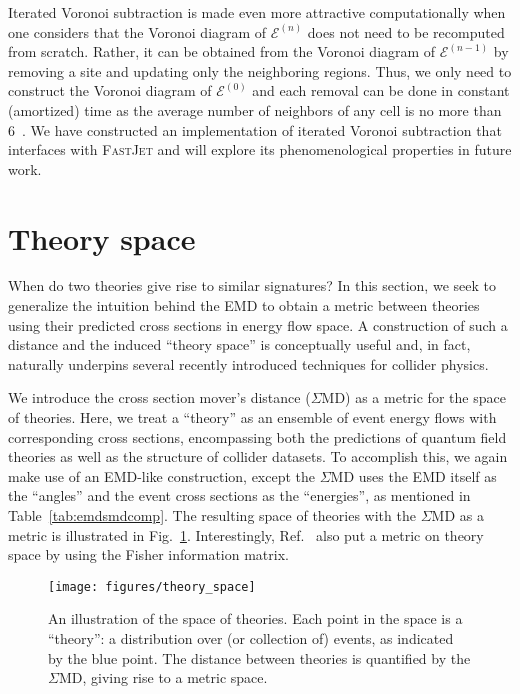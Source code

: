 \documentclass[letterpaper,11pt]{article}
\newcommand{\E}{\mathcal{E}}
\DeclareRobustCommand{\Tab}[1]{Table~\ref{#1}}
\DeclareRobustCommand{\Fig}[1]{Fig.~\ref{#1}}
\DeclareRobustCommand{\Ref}[1]{Ref.~\cite{#1}}
\begin{document}
Iterated Voronoi subtraction is made even more attractive computationally when one considers that the Voronoi diagram of $\E^{(n)}$ does not need to be recomputed from scratch.
%
Rather, it can be obtained from the Voronoi diagram of $\E^{(n-1)}$ by removing a site and updating only the neighboring regions.
%
Thus, we only need to construct the Voronoi diagram of $\E^{(0)}$ and each removal can be done in constant (amortized) time as the average number of neighbors of any cell is no more than 6~\cite{Aurenhammer2013:book}.
%
We have constructed an implementation of iterated Voronoi subtraction that interfaces with \textsc{FastJet} and will explore its phenomenological properties in future work.



\section{Theory space}
\label{sec:theory}


When do two theories give rise to similar signatures?
%
In this section, we seek to generalize the intuition behind the EMD to obtain a metric between theories using their predicted cross sections in energy flow space.
%
A construction of such a distance and the induced ``theory space'' is conceptually useful and, in fact, naturally underpins several recently introduced techniques for collider physics.


We introduce the cross section mover's distance ($\Sigma$MD) as a metric for the space of theories.
%
Here, we treat a ``theory'' as an ensemble of event energy flows with corresponding cross sections, encompassing both the predictions of quantum field theories as well as the structure of collider datasets.
%
To accomplish this, we again make use of an EMD-like construction, except the $\Sigma$MD uses the EMD itself as the ``angles'' and the event cross sections as the ``energies'', as mentioned in \Tab{tab:emdsmdcomp}.
%
The resulting space of theories with the $\Sigma$MD as a metric is illustrated in \Fig{fig:theory_space}.
%
Interestingly, \Ref{Erdmenger:2020abc} also put a metric on theory space by using the Fisher information matrix.


\begin{figure}[t]
\centering
\texttt{[image: figures/theory\_space]}
\caption{\label{fig:theory_space} An illustration of the space of theories.
%
Each point in the space is a ``theory'': a distribution over (or collection of) events, as indicated by the blue point.
%
The distance between theories is quantified by the $\Sigma$MD, giving rise to a metric space.}
\end{figure}
\end{document}
